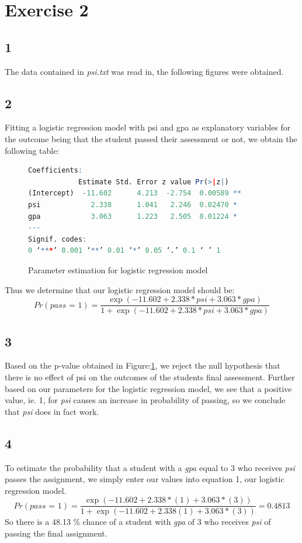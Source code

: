 \documentclass{article}
\begin{document}
  \section*{Exercise 2}
    \subsection*{1}
    The data contained in \textit{psi.txt} was read in, the following figures were obtained.
    \subsection*{2}
    Fitting a logistic regression model with psi and gpa as explanatory variables for the outcome being that the student passed their assessment or not, we obtain the following table:
    	\begin{figure}[H]
    	\begin{lstlisting}[language=R]
	Coefficients:
            Estimate Std. Error z value Pr(>|z|)   
(Intercept)  -11.602      4.213  -2.754  0.00589 **
psi            2.338      1.041   2.246  0.02470 * 
gpa            3.063      1.223   2.505  0.01224 * 
---
Signif. codes:  
0 ‘***’ 0.001 ‘**’ 0.01 ‘*’ 0.05 ‘.’ 0.1 ‘ ’ 1
    	\end{lstlisting}
    	\caption{Parameter estimation for logistic regression model}
    	\label{fig:log_reg}
    \end{figure}
    
    Thus we determine that our logistic regression model should be:
    \begin{equation}
   	Pr(\textit{pass = 1}) = \frac{\exp(-11.602 + 2.338*\textit{psi} + 3.063*\textit{gpa})}{1 + \exp(-11.602 + 2.338*\textit{psi} + 3.063*\textit{gpa})}
    \end{equation}
    \subsection*{3}
    Based on the p-value obtained in Figure:\ref{fig:log_reg}, we reject the null hypothesis that there is no effect of psi on the outcomes of the students final assessment. Further based on our parameters for the logistic regression model, we see that a positive value, ie. 1, for \textit{psi} causes an increase in probability of passing, so we conclude that \textit{psi} does in fact work.
    \subsection*{4}
    To estimate the probability that a student with a \textit{gpa} equal to 3 who receives \textit{psi} passes the assignment, we simply enter our values into equation 1, our logistic regression model.
    \[
    Pr(\textit{pass = 1}) = \frac{\exp(-11.602 + 2.338*(1) + 3.063*(3))}{1 + \exp(-11.602 + 2.338(1) + 3.063*(3))} = 0.4813
    \]
    So there is a 48.13 \% chance of a student with \textit{gpa} of 3 who receives \textit{psi} of passing the final assignment.
    
\end{document}
